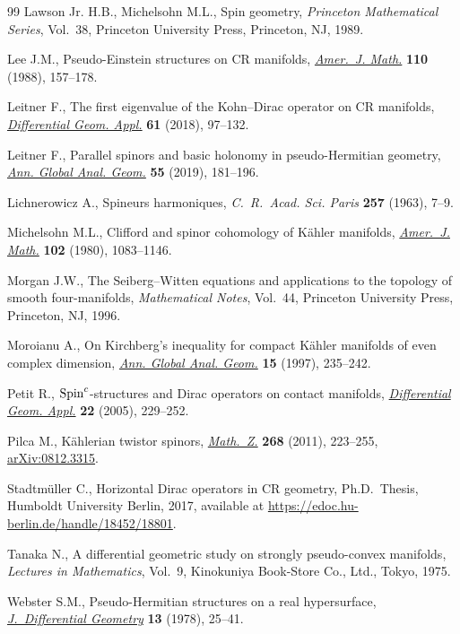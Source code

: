 \documentclass[10pt,a4paper]{amsart}
\numberwithin{equation}{section}
\begin{document}
\begin{thebibliography}{99}
Lawson Jr. H.B., Michelsohn M.L., Spin geometry, \textit{Princeton Mathematical
 Series}, Vol.~38, Princeton University Press, Princeton, NJ, 1989.

Lee J.M., Pseudo-{E}instein structures on {CR} manifolds, \href{https://doi.org/10.2307/2374543}{\textit{Amer.~J.
 Math.}} \textbf{110} (1988), 157--178.

Leitner F., The first eigenvalue of the {K}ohn--{D}irac operator on {CR}
 manifolds, \href{https://doi.org/10.1016/j.difgeo.2018.08.004}{\textit{Differential Geom. Appl.}} \textbf{61} (2018), 97--132.

Leitner F., Parallel spinors and basic holonomy in pseudo-{H}ermitian geometry,
 \href{https://doi.org/10.1007/s10455-018-9622-4}{\textit{Ann. Global Anal. Geom.}} \textbf{55} (2019), 181--196.

Lichnerowicz A., Spineurs harmoniques, \textit{C.~R.~Acad. Sci. Paris}
 \textbf{257} (1963), 7--9.

Michelsohn M.L., Clifford and spinor cohomology of {K}\"ahler manifolds,
 \href{https://doi.org/10.2307/2374181}{\textit{Amer.~J. Math.}} \textbf{102} (1980), 1083--1146.

Morgan J.W., The {S}eiberg--{W}itten equations and applications to the topology
 of smooth four-manifolds, \textit{Mathematical Notes}, Vol.~44, Princeton
 University Press, Princeton, NJ, 1996.

Moroianu A., On {K}irchberg's inequality for compact {K}\"ahler manifolds of
 even complex dimension, \href{https://doi.org/10.1023/A:1006543304443}{\textit{Ann. Global Anal. Geom.}} \textbf{15} (1997),
 235--242.

Petit R., {${\rm Spin}^c$}-structures and {D}irac operators on contact
 manifolds, \href{https://doi.org/10.1016/j.difgeo.2005.01.003}{\textit{Differential Geom. Appl.}} \textbf{22} (2005), 229--252.

Pilca M., K\"ahlerian twistor spinors, \href{https://doi.org/10.1007/s00209-010-0668-7}{\textit{Math.~Z.}} \textbf{268} (2011),
 223--255, \href{https://arxiv.org/abs/0812.3315}{arXiv:0812.3315}.

Stadtm\"uller C., Horizontal Dirac operators in CR geometry, Ph.D.~Thesis,
 {H}umboldt University Berlin, 2017, available at
 \url{https://edoc.hu-berlin.de/handle/18452/18801}.

Tanaka N., A differential geometric study on strongly pseudo-convex manifolds,
 \textit{Lectures in Mathematics}, Vol.~9, Kinokuniya Book-Store Co., Ltd.,
 Tokyo, 1975.

Webster S.M., Pseudo-{H}ermitian structures on a real hypersurface,
 \href{https://doi.org/10.4310/jdg/1214434345}{\textit{J.~Differential Geometry}} \textbf{13} (1978), 25--41.

\end{thebibliography}
\end{document}
